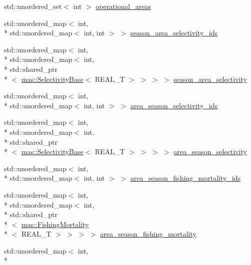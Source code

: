 \begin{DoxyCompactItemize}
\item 
std\-::unordered\-\_\-set$<$ int $>$ \hyperlink{structmas_1_1_fleet_aaa8ca2ea30b1afee976199eaabd6caa0}{operational\-\_\-areas}
\item 
std\-::unordered\-\_\-map$<$ int, \\*
std\-::unordered\-\_\-map$<$ int, int $>$ $>$ \hyperlink{structmas_1_1_fleet_a2c2c1b323ec7845085ebe105b5f64096}{season\-\_\-area\-\_\-selectivity\-\_\-ids}
\item 
std\-::unordered\-\_\-map$<$ int, \\*
std\-::unordered\-\_\-map$<$ int, \\*
std\-::shared\-\_\-ptr\\*
$<$ \hyperlink{structmas_1_1_selectivity_base}{mas\-::\-Selectivity\-Base}$<$ R\-E\-A\-L\-\_\-\-T $>$ $>$ $>$ $>$ \hyperlink{structmas_1_1_fleet_aa8e734855b66757bf86314f6ae76878c}{season\-\_\-area\-\_\-selectivity}
\item 
std\-::unordered\-\_\-map$<$ int, \\*
std\-::unordered\-\_\-map$<$ int, int $>$ $>$ \hyperlink{structmas_1_1_fleet_ac13bc4011086cb3fc3b6838d02885db5}{area\-\_\-season\-\_\-selectivity\-\_\-ids}
\item 
std\-::unordered\-\_\-map$<$ int, \\*
std\-::unordered\-\_\-map$<$ int, \\*
std\-::shared\-\_\-ptr\\*
$<$ \hyperlink{structmas_1_1_selectivity_base}{mas\-::\-Selectivity\-Base}$<$ R\-E\-A\-L\-\_\-\-T $>$ $>$ $>$ $>$ \hyperlink{structmas_1_1_fleet_a0cf9a3f0c5ae179699c1264a7583db56}{area\-\_\-season\-\_\-selectivity}
\item 
std\-::unordered\-\_\-map$<$ int, \\*
std\-::unordered\-\_\-map$<$ int, int $>$ $>$ \hyperlink{structmas_1_1_fleet_a31e805b1616d5a216530b48ea154c973}{area\-\_\-season\-\_\-fishing\-\_\-mortality\-\_\-ids}
\item 
std\-::unordered\-\_\-map$<$ int, \\*
std\-::unordered\-\_\-map$<$ int, \\*
std\-::shared\-\_\-ptr\\*
$<$ \hyperlink{structmas_1_1_fishing_mortality}{mas\-::\-Fishing\-Mortality}\\*
$<$ R\-E\-A\-L\-\_\-\-T $>$ $>$ $>$ $>$ \hyperlink{structmas_1_1_fleet_a5fbc6ef08467142e1797a26f557481e8}{area\-\_\-season\-\_\-fishing\-\_\-mortality}
\item 
std\-::unordered\-\_\-map$<$ int, \\*

\end{DoxyCompactItemize}
